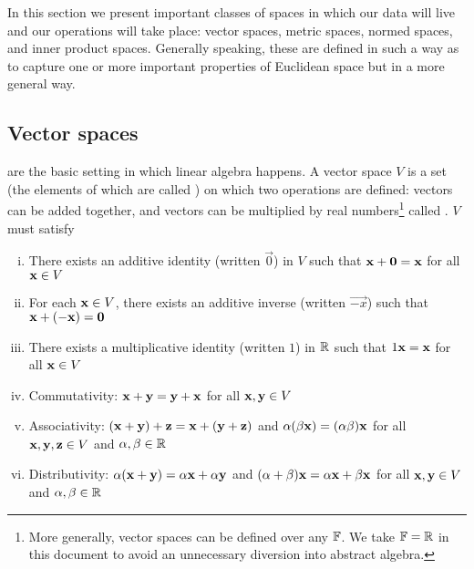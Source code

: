 In this section we present important classes of spaces in which our data will live and our operations will take place: vector spaces, metric spaces, normed spaces, and inner product spaces.
Generally speaking, these are defined in such a way as to capture one or more important properties of Euclidean space but in a more general way.

\subsection{Vector spaces}
 are the basic setting in which linear algebra happens.
A vector space $V$ is a set (the elements of which are called ) on which two operations are defined: vectors can be added together, and vectors can be multiplied by real numbers\footnote{
    More generally, vector spaces can be defined over any  $\mathbb{F}$.
    We take $\mathbb{F} = \mathbb{R}$ in this document to avoid an unnecessary diversion into abstract algebra.
} called .
$V$ must satisfy
\begin{enumerate}[(i)]
\item There exists an additive identity (written $\vec{0}$) in $V$ such that $\mathbf{x}+\mathbf{0} = \mathbf{x}$ for all $\mathbf{x} \in V$
\item For each $\mathbf{x} \in V$, there exists an additive inverse (written $\vec{-x}$) such that $\mathbf{x}+(\mathbf{-x}) = \mathbf{0}$
\item There exists a multiplicative identity (written $1$) in $\mathbb{R}$ such that $1\mathbf{x} = \mathbf{x}$ for all $\mathbf{x} \in V$
\item Commutativity: $\mathbf{x}+\mathbf{y} = \mathbf{y}+\mathbf{x}$ for all $\mathbf{x}, \mathbf{y} \in V$
\item Associativity: $(\mathbf{x}+\mathbf{y})+\mathbf{z} = \mathbf{x}+(\mathbf{y}+\mathbf{z})$ and $\alpha(\beta\mathbf{x}) = (\alpha\beta)\mathbf{x}$ for all $\mathbf{x}, \mathbf{y}, \mathbf{z} \in V$ and $\alpha, \beta \in \mathbb{R}$
\item Distributivity: $\alpha(\mathbf{x}+\mathbf{y}) = \alpha\mathbf{x} + \alpha\mathbf{y}$ and $(\alpha+\beta)\mathbf{x} = \alpha\mathbf{x} + \beta\mathbf{x}$ for all $\mathbf{x}, \mathbf{y} \in V$ and $\alpha, \beta \in \mathbb{R}$
\end{enumerate}


